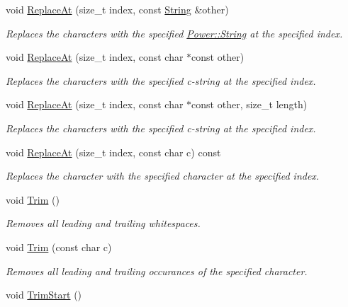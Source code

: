 \begin{DoxyCompactItemize}
void \hyperlink{class_power_1_1_string_ac6ffc1ce89a2caff3d96cbb738f3f081}{Replace\+At} (size\+\_\+t index, const \hyperlink{class_power_1_1_string}{String} \&other)
\begin{DoxyCompactList}\small\item\em Replaces the characters with the specified \hyperlink{class_power_1_1_string}{Power\+::\+String} at the specified index. \end{DoxyCompactList}\item 
void \hyperlink{class_power_1_1_string_a5e666114028b7a41dc402eae7dd9ab37}{Replace\+At} (size\+\_\+t index, const char $\ast$const other)
\begin{DoxyCompactList}\small\item\em Replaces the characters with the specified c-\/string at the specified index. \end{DoxyCompactList}\item 
void \hyperlink{class_power_1_1_string_af5aa96c8291a9aceb80aa7172a7a2790}{Replace\+At} (size\+\_\+t index, const char $\ast$const other, size\+\_\+t length)
\begin{DoxyCompactList}\small\item\em Replaces the characters with the specified c-\/string at the specified index. \end{DoxyCompactList}\item 
void \hyperlink{class_power_1_1_string_af0a58ed0c1b62fc36e60f5948d3e8052}{Replace\+At} (size\+\_\+t index, const char c) const
\begin{DoxyCompactList}\small\item\em Replaces the character with the specified character at the specified index. \end{DoxyCompactList}\item 
void \hyperlink{class_power_1_1_string_adccf591064c5f8a4681930a01318e023}{Trim} ()
\begin{DoxyCompactList}\small\item\em Removes all leading and trailing whitespaces. \end{DoxyCompactList}\item 
void \hyperlink{class_power_1_1_string_afd78e65baee3fdbd249616dd03ee6eaa}{Trim} (const char c)
\begin{DoxyCompactList}\small\item\em Removes all leading and trailing occurances of the specified character. \end{DoxyCompactList}\item 
void \hyperlink{class_power_1_1_string_ac83fee188935bfea5a486d135f8e39e3}{Trim\+Start} ()

\end{DoxyCompactItemize}
